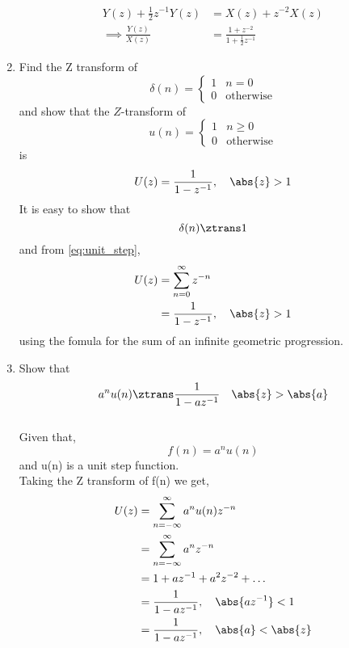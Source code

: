 \documentclass[journal,12pt,twocolumn]{IEEEtran}
\renewcommand\thesection{\arabic{section}}
\begin{document}
\begin{enumerate}[label=\thesection.\arabic*]
\begin{align}
Y(z) + \frac{1}{2}z^{-1}Y(z) &= X(z)+z^{-2}X(z)
\\
\implies \frac{Y(z)}{X(z)} &= \frac{1 + z^{-2}}{1 + \frac{1}{2}z^{-1}}
\label{eq:freq_resp}
\end{align}
%
\item Find the Z transform of 
\begin{equation}
\delta(n)
=
\begin{cases}
1 & n = 0
\\
0 & \text{otherwise}
\end{cases}
\end{equation}
and show that the $Z$-transform of
\begin{equation}
\label{eq:unit_step}
u(n)
=
\begin{cases}
1 & n \ge 0
\\
0 & \text{otherwise}
\end{cases}
\end{equation}
is
\begin{equation}
U(z) = \frac{1}{1-z^{-1}}, \quad \abs{z} > 1
\end{equation}
\solution It is easy to show that
\begin{equation}
\delta(n) \ztrans 1
\end{equation}
and from \eqref{eq:unit_step},
\begin{align}
U(z) &= \sum _{n= 0}^{\infty}z^{-n}
\\
&=\frac{1}{1-z^{-1}}, \quad \abs{z} > 1
\end{align}
using the fomula for the sum of an infinite geometric progression.
%
\item Show that 
\begin{equation}
\label{eq:anun}
a^nu(n) \ztrans \frac{1}{1-az^{-1}} \quad \abs{z} > \abs{a}
\end{equation}
\solution \\
Given that,
\begin{equation}
	f(n) =a^nu(n)	
\end{equation} and u(n) is a unit step function.\\ Taking the Z transform of f(n) we get,
\begin{align}
	U(z) &= \sum _{n= -\infty}^{\infty}a^nu(n)z^{-n}
	\\&=\sum _{n= -\infty}^{\infty}a^nz^{-n}
	\\&= 1+az^{-1}+a^2z^{-2}+\dots
	\\&=\frac{1}{1-az^{-1}}, \quad \abs{az^{-1}} <1
	\\&=\frac{1}{1-az^{-1}}, \quad \abs{a} <\abs{z}

\end{align}
\end{enumerate}
\end{document}
